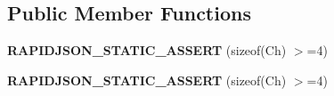 \subsection*{Public Member Functions}
\begin{DoxyCompactItemize}
\item 
\mbox{\label{structUTF32_aae11b766f799d311679d59e9f7077f83}} 
{\bfseries R\+A\+P\+I\+D\+J\+S\+O\+N\+\_\+\+S\+T\+A\+T\+I\+C\+\_\+\+A\+S\+S\+E\+RT} (sizeof(Ch) $>$=4)
\item 
\mbox{\label{structUTF32_aae11b766f799d311679d59e9f7077f83}} 
{\bfseries R\+A\+P\+I\+D\+J\+S\+O\+N\+\_\+\+S\+T\+A\+T\+I\+C\+\_\+\+A\+S\+S\+E\+RT} (sizeof(Ch) $>$=4)
\end{DoxyCompactItemize}
